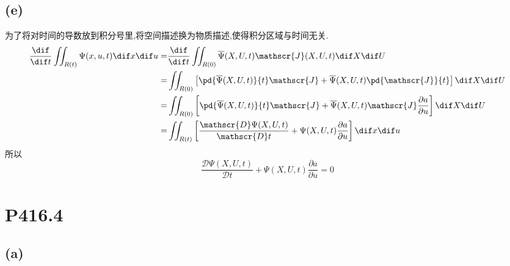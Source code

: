 \documentclass[12pt]{article}
\begin{document}
\subsection{(e)}

为了将对时间的导数放到积分号里,将空间描述换为物质描述,使得积分区域与时间无关.
\begin{equation}
	\begin{split}
		\frac{\dif }{\dif t}\iint_{R(t)} \Psi(x,u,t)\dif x\dif u = & \frac{\dif }{\dif t} \iint_{R(0)} \overline\Psi(X,U,t)\mathscr{J}(X,U,t)\dif X\dif U\\
		= &  \iint_{R(0)} \left[ \pd{\overline\Psi(X,U,t)}{t} \mathscr{J} + \overline\Psi(X,U,t)\pd{\mathscr{J}}{t} \right] \dif X\dif U\\
		= & \iint_{R(0)} \left[ \pd{\overline\Psi(X,U,t)}{t} \mathscr{J} + \overline\Psi(X,U,t)\mathscr{J}\frac{\partial a}{\partial u} \right] \dif X\dif U\\
		= & \iint_{R(t)} \left[ \frac{\mathscr{D} \Psi(X,U,t)}{\mathscr{D} t}  + \Psi(X,U,t)\frac{\partial a}{\partial u} \right]\dif x\dif u
	\end{split}
\end{equation}
所以
\begin{equation}
	\frac{\mathscr{D} \Psi(X,U,t)}{\mathscr{D} t}  + \Psi(X,U,t)\frac{\partial a}{\partial u} = 0
\end{equation}

\section{P416.4}

\subsection{(a)}
\end{document}
